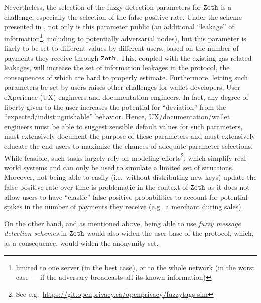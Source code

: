 Nevertheless, the selection of the fuzzy detection parameters for $\texttt{Zeth}$ is a challenge, especially the selection of the false-positive rate.
Under the scheme presented in \cite{DBLP:journals/iacr/BeckLMG21}, not only is this parameter public (an additional ``leakage'' of information\footnote{limited to one server (in the best case), or to the whole network (in the worst case --- if the adversary broadcasts all its known information)}, including to potentially adversarial nodes), but this parameter is likely to be set to different values by different users, based on the number of payments they receive through $\texttt{Zeth}$.  This, coupled with the existing gas-related leakages, will increase the set of information leakages in the protocol, the consequences of which are hard to properly estimate. Furthermore, letting such parameters be set by users raises other challenges for wallet developers, User eXperience (UX) engineers and documentation engineers. In fact, any degree of liberty given to the user increases the potential for ``deviation'' from the ``expected/indistinguishable'' behavior. Hence, UX/documentation/wallet engineers must be able to suggest sensible default values for such parameters, must extensively document the purpose of these parameters and must extensively educate the end-users to maximize the chances of adequate parameter selections. While feasible, such tasks largely rely on modeling efforts\footnote{See e.g.~\url{https://git.openprivacy.ca/openprivacy/fuzzytags-sim}}, which simplify real-world systems and can only be used to simulate a limited set of situations.
Moreover, not being able to easily (i.e.~without distributing new keys) update the false-positive rate over time is problematic in the context of $\texttt{Zeth}$ as it does not allow users to have ``elastic'' false-positive probabilities to account for potential spikes in the number of payments they receive (e.g.~a merchant during sales).

On the other hand, and as mentioned above, being able to use \emph{fuzzy message detection schemes} in $\texttt{Zeth}$ would also widen the user base of the protocol, which, as a consequence, would widen the anonymity set.
